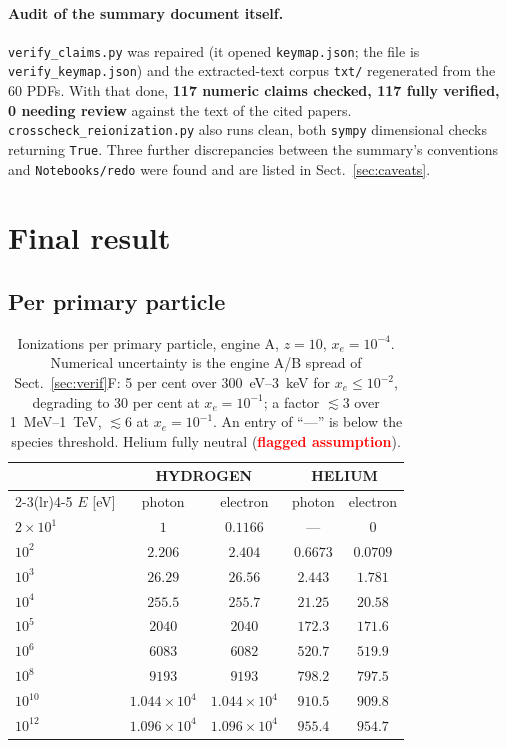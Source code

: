 \documentclass[11pt,a4paper]{article}
\newcommand{\flag}[1]{\textbf{\textcolor{red}{#1}}}
\begin{document}
\paragraph{Audit of the summary document itself.}
\texttt{verify\_claims.py} was repaired (it opened \texttt{keymap.json}; the
file is \texttt{verify\_keymap.json}) and the extracted-text corpus
\texttt{txt/} regenerated from the 60 PDFs.  With that done,
\textbf{117 numeric claims checked, 117 fully verified, 0 needing review}
against the text of the cited papers.  \texttt{crosscheck\_reionization.py}
also runs clean, both \texttt{sympy} dimensional checks returning
\texttt{True}.  Three further discrepancies between the summary's conventions
and \texttt{Notebooks/redo} were found and are listed in
Sect.~\ref{sec:caveats}.

\section{Final result}

\subsection{Per primary particle}

\begin{table}[htbp]
\centering
\caption{Ionizations per primary particle, engine A, $z=10$, $x_e=10^{-4}$.
Numerical uncertainty is the engine A/B spread of
Sect.~\ref{sec:verif}F: 5 per cent over 300~eV--3~keV for
$x_e\le10^{-2}$, degrading to 30 per cent at $x_e=10^{-1}$; a factor
$\lesssim3$ over 1~MeV--1~TeV, $\lesssim6$ at $x_e=10^{-1}$.  An entry of
``---'' is below the species threshold.  Helium fully neutral
(\flag{flagged assumption}).}
\label{tab:peryield}
\begin{tabular}{lcccc}
\toprule
& \multicolumn{2}{c}{HYDROGEN} & \multicolumn{2}{c}{HELIUM} \\
\cmidrule(lr){2-3}\cmidrule(lr){4-5}
$E$ [eV] & photon & electron & photon & electron \\
\midrule
$2\times10^{1}$ & $1$ & $0.1166$ & --- & $0$\\
$10^{2}$ & $2.206$ & $2.404$ & $0.6673$ & $0.0709$\\
$10^{3}$ & $26.29$ & $26.56$ & $2.443$ & $1.781$\\
$10^{4}$ & $255.5$ & $255.7$ & $21.25$ & $20.58$\\
$10^{5}$ & $2040$ & $2040$ & $172.3$ & $171.6$\\
$10^{6}$ & $6083$ & $6082$ & $520.7$ & $519.9$\\
$10^{8}$ & $9193$ & $9193$ & $798.2$ & $797.5$\\
$10^{10}$ & $1.044\times10^{4}$ & $1.044\times10^{4}$ & $910.5$ & $909.8$\\
$10^{12}$ & $1.096\times10^{4}$ & $1.096\times10^{4}$ & $955.4$ & $954.7$\\
\bottomrule
\end{tabular}
\end{table}
\end{document}

